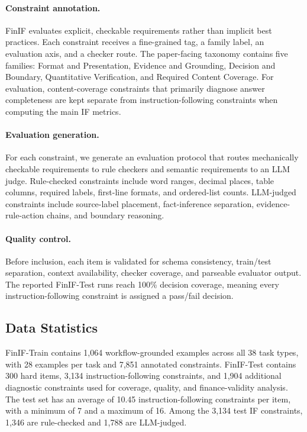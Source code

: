 \paragraph{Constraint annotation.}
FinIF evaluates explicit, checkable requirements rather than implicit best practices.
Each constraint receives a fine-grained tag, a family label, an evaluation axis, and a checker route.
The paper-facing taxonomy contains five families: Format and Presentation, Evidence and Grounding, Decision and Boundary, Quantitative Verification, and Required Content Coverage.
For evaluation, content-coverage constraints that primarily diagnose answer completeness are kept separate from instruction-following constraints when computing the main IF metrics.

\paragraph{Evaluation generation.}
For each constraint, we generate an evaluation protocol that routes mechanically checkable requirements to rule checkers and semantic requirements to an LLM judge.
Rule-checked constraints include word ranges, decimal places, table columns, required labels, first-line formats, and ordered-list counts.
LLM-judged constraints include source-label placement, fact-inference separation, evidence-rule-action chains, and boundary reasoning.

\paragraph{Quality control.}
Before inclusion, each item is validated for schema consistency, train/test separation, context availability, checker coverage, and parseable evaluator output.
The reported FinIF-Test runs reach 100\% decision coverage, meaning every instruction-following constraint is assigned a pass/fail decision.

\subsection{Data Statistics}

FinIF-Train contains 1,064 workflow-grounded examples across all 38 task types, with 28 examples per task and 7,851 annotated constraints.
FinIF-Test contains 300 hard items, 3,134 instruction-following constraints, and 1,904 additional diagnostic constraints used for coverage, quality, and finance-validity analysis.
The test set has an average of 10.45 instruction-following constraints per item, with a minimum of 7 and a maximum of 16.
Among the 3,134 test IF constraints, 1,346 are rule-checked and 1,788 are LLM-judged.

